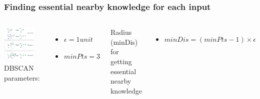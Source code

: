 \begin{frame}
    \frametitle{Finding essential nearby knowledge for each input}
    \begin{columns}
             \centering
             \includegraphics[width=0.8\textwidth]{resource/figures/context.png}
            DBSCAN parameters:
            \begin{itemize}
                \item $\epsilon = 1 unit$
                \item $minPts = 3$
            \end{itemize}
            \vspace{1cm}
            Radius (minDis) for getting \\essential nearby knowledge
            \begin{itemize}
                \item \small $minDis = (minPts - 1) \times \epsilon$
            \end{itemize}
    \end{columns}
\end{frame}


